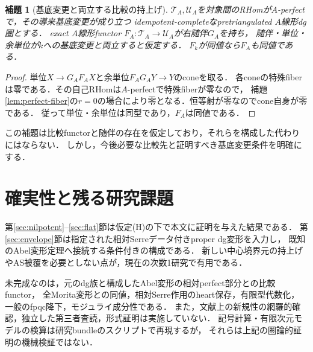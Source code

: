 \documentclass[11pt,a4paper]{ltjsarticle}
\newtheorem{lemma}[theorem]{補題}
\theoremstyle{definition}
\newcommand{\TT}{\mathcal T}
\newcommand{\UU}{\mathcal U}
\begin{document}
\begin{lemma}[基底変更と両立する比較の持上げ]\label{lem:lift-equivalence}
$\TT_A,\UU_A$を対象間のRHomが$A$-perfectで，その導来基底変更が成り立つ
idempotent-completeなpretriangulated $A$線形dg圏とする．
exact $A$線形functor $F_A:\TT_A\to\UU_A$が右随伴$G_A$を持ち，
随伴・単位・余単位が$k$への基底変更と両立すると仮定する．
$F_k$が同値なら$F_A$も同値である．
\end{lemma}
\begin{proof}
単位$X\to G_AF_AX$と余単位$F_AG_AY\to Y$のconeを取る．
各coneの特殊fiberは零である．その自己RHomは$A$-perfectで特殊fiberが零なので，
補題\ref{lem:perfect-fiber}の$r=0$の場合により零となる．恒等射が零なのでcone自身が零である．
従って単位・余単位は同型であり，$F_A$は同値である．
\end{proof}
この補題は比較functorと随伴の存在を仮定しており，それらを構成した代わりにはならない．
しかし，今後必要な比較先と証明すべき基底変更条件を明確にする．

\section{確実性と残る研究課題}\label{sec:status}
第\ref{sec:nilpotent}--\ref{sec:flat}節は仮定\textup{(H)}の下で本文に証明を与えた結果である．
第\ref{sec:envelope}節は指定された相対Serreデータ付きproper dg変形を入力し，
既知のAbel変形定理へ接続する条件付きの構成である．
新しい中心境界元の持上げやAS被覆を必要としない点が，現在の次数1研究で有用である．

未完成なのは，元のdg族と構成したAbel変形の相対perfect部分との比較functor，
全Morita変形との同値，相対Serre作用のheart保存，有限型代数化，
一般のfpqc降下，モジュライ成分性である．
また，文献上の新規性の網羅的確認，独立した第三者査読，形式証明は実施していない．
記号計算・有限次元モデルの検算は研究bundleのスクリプトで再現するが，
それらは上記の圏論的証明の機械検証ではない．
\end{document}
